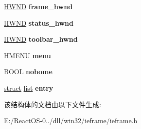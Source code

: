 \begin{DoxyCompactItemize}
\hyperlink{interfacevoid}{H\+W\+ND} {\bfseries frame\+\_\+hwnd}
\item 
\mbox{\label{struct_internet_explorer_a966c46b9d93ecdff46719a0aa735d64f}} 
\hyperlink{interfacevoid}{H\+W\+ND} {\bfseries status\+\_\+hwnd}
\item 
\mbox{\label{struct_internet_explorer_a2f02041f79f7368879d5fd0de9e912ba}} 
\hyperlink{interfacevoid}{H\+W\+ND} {\bfseries toolbar\+\_\+hwnd}
\item 
\mbox{\label{struct_internet_explorer_a189509e1c953297ef4155270188c5388}} 
H\+M\+E\+NU {\bfseries menu}
\item 
\mbox{\label{struct_internet_explorer_a7ea835202d6608a7c500dfec75189f57}} 
B\+O\+OL {\bfseries nohome}
\item 
\mbox{\label{struct_internet_explorer_a925476ab6b4da35753a30e0e2a31f44b}} 
\hyperlink{interfacestruct}{struct} \hyperlink{classlist}{list} {\bfseries entry}
\end{DoxyCompactItemize}


该结构体的文档由以下文件生成\+:\begin{DoxyCompactItemize}
\item 
E\+:/\+React\+O\+S-\/0../dll/win32/ieframe/ieframe.\+h\end{DoxyCompactItemize}
